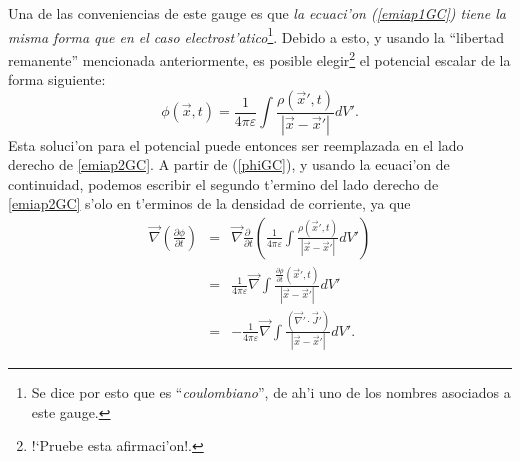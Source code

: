 Una de las conveniencias de este gauge es que \textit{la ecuaci'on (\ref{emiap1GC}) tiene la misma forma que en el caso electrost'atico}\footnote{Se dice por esto que es ``\textit{coulombiano}'', de ah'i uno de los nombres asociados a este gauge.}. Debido a esto, y usando la ``libertad remanente'' mencionada anteriormente, es posible elegir\footnote{!`Pruebe esta afirmaci'on!.} el potencial escalar de la forma siguiente:
\begin{equation}\label{phiGC}
\boxed{ \phi(\vec{x},t)=\frac{1}{4\pi\varepsilon}\int\frac{\rho(\vec{x}',t)}{\left|\vec{x}-\vec{x}'\right|}dV'.}
\end{equation}
Esta soluci'on para el potencial puede entonces ser reemplazada en el lado derecho de \eqref{emiap2GC}. 
A partir de (\ref{phiGC}), y usando la ecuaci'on de continuidad, podemos escribir el segundo t'ermino del lado derecho de \eqref{emiap2GC} s'olo en t'erminos de la densidad de corriente, ya que
\begin{eqnarray}
\vec{\nabla}\left(\frac{\partial\phi }{\partial t}\right)&=&  \vec{\nabla}\frac{\partial\ }{\partial t}\left(\frac{1}{4\pi\varepsilon}\int\frac{\rho(\vec{x}',t)}{\left|\vec{x}-\vec{x}'\right|}dV'\right) \\
&=&  \frac{1}{4\pi\varepsilon}\vec{\nabla}\int\frac{\frac{\partial\rho }{\partial t}(\vec{x}',t)}{\left|\vec{x}-\vec{x}'\right|}dV' \\
&=& - \frac{1}{4\pi\varepsilon} \vec{\nabla}\int\frac{(\vec{\nabla}'\cdot\vec{J}')}{\left|\vec{x}-\vec{x}'\right|}dV' .%
\end{eqnarray}
